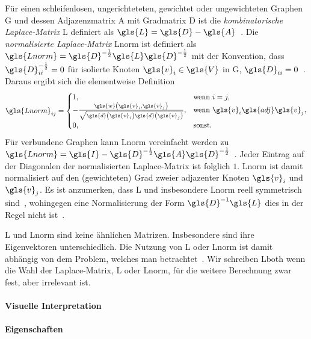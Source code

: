 Für einen schleifenlosen, ungerichteteten, gewichtet oder ungewichteten Graphen \gls{G} und dessen Adjazenzmatrix \gls{A} mit Gradmatrix \gls{D} ist die \emph{kombinatorische Laplace-Matrix} \gls{L} definiert als $\gls{L} = \gls{D} - \gls{A}$~\cite{Chung}.
Die \emph{normalisierte Laplace-Matrix} \gls{Lnorm} ist definiert als $\gls{Lnorm} = \gls{D}^{-\frac{1}{2}} \gls{L} \gls{D}^{-\frac{1}{2}}$ mit der Konvention, dass $\gls{D}^{-\frac{1}{2}}_{ii} = 0$ für isolierte Knoten $\gls{v}_i \in \gls{V}$ in \gls{G}, \dhe{} $\gls{D}_{ii} = 0$~\cite{Chung}.
Daraus ergibt sich die elementweise Definition
\begin{equation*}
  \gls{Lnorm}_{ij} = \begin{cases}
  1, & \text{wenn }i = j,\\
    -\frac{\gls{w}\left(\gls{v}_i, \gls{v}_j\right)}{\sqrt{\gls{d}\left(\gls{v}_i\right)\gls{d}\left(\gls{v}_j\right)}}, & \text{wenn }\gls{v}_i \gls{adj} \gls{v}_j,\\
  0, & \text{sonst.}
\end{cases}
\end{equation*}
Für verbundene Graphen kann \gls{Lnorm} vereinfacht werden zu $\gls{Lnorm} = \gls{I} - \gls{D}^{-\frac{1}{2}} \gls{A} \gls{D}^{-\frac{1}{2}}$~\cite{Chung}.
Jeder Eintrag auf der Diagonalen der normalisierten Laplace-Matrix ist folglich $1$.
\gls{Lnorm} ist damit normalisiert auf den (gewichteten) Grad zweier adjazenter Knoten $\gls{v}_i$ und $\gls{v}_j$.
Es ist anzumerken, dass \gls{L} und insbesondere \gls{Lnorm} reell symmetrisch sind~\cite{Chung}, wohingegen eine Normalisierung der Form $\gls{D}^{-1}\gls{L}$ dies in der Regel nicht ist~\cite{Reuter}.

\gls{L} und \gls{Lnorm} sind keine ähnlichen Matrizen.
Insbesondere sind ihre Eigenvektoren unterschiedlich.
Die Nutzung von \gls{L} oder \gls{Lnorm} ist damit abhängig von dem Problem, welches man betrachtet~\cite{Hammond}.
Wir schreiben \gls{Lboth} wenn die Wahl der Laplace-Matrix, \gls{L} oder \gls{Lnorm}, für die weitere Berechnung zwar fest, aber irrelevant ist.

\paragraph{Visuelle Interpretation}
\label{laplace_interpretation}


\paragraph{Eigenschaften}
\label{laplace_eigenschaften}

